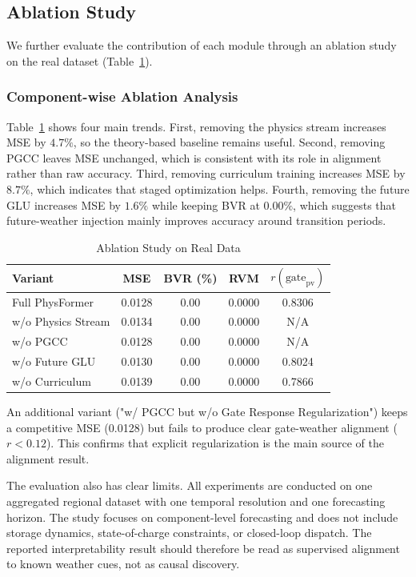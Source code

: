 \subsection{Ablation Study}
\label{subsec:ablation}

We further evaluate the contribution of each module through an ablation study on the real dataset (Table~\ref{tab:ablation}).

\subsubsection{Component-wise Ablation Analysis}
Table~\ref{tab:ablation} shows four main trends. First, removing the physics stream increases MSE by $4.7\%$, so the theory-based baseline remains useful. Second, removing PGCC leaves MSE unchanged, which is consistent with its role in alignment rather than raw accuracy. Third, removing curriculum training increases MSE by $8.7\%$, which indicates that staged optimization helps. Fourth, removing the future GLU increases MSE by $1.6\%$ while keeping BVR at $0.00\%$, which suggests that future-weather injection mainly improves accuracy around transition periods.

\begin{table}[htbp]
\centering
\caption{Ablation Study on Real Data}
\label{tab:ablation}
\footnotesize
\setlength{\tabcolsep}{3pt}
\begin{tabular*}{\columnwidth}{@{\extracolsep{\fill}}lcccc@{}}
\toprule
Variant & MSE & BVR (\%) & RVM & $r(\text{gate}_{\text{pv}})$ \\
\midrule
Full PhysFormer & 0.0128 & 0.00 & 0.0000 & 0.8306 \\
w/o Physics Stream & 0.0134 & 0.00 & 0.0000 & N/A \\
w/o PGCC & 0.0128 & 0.00 & 0.0000 & N/A \\
w/o Future GLU & 0.0130 & 0.00 & 0.0000 & 0.8024 \\
w/o Curriculum & 0.0139 & 0.00 & 0.0000 & 0.7866 \\
\bottomrule
\end{tabular*}
\end{table}

An additional variant ("w/ PGCC but w/o Gate Response Regularization") keeps a competitive MSE (0.0128) but fails to produce clear gate-weather alignment ($r < 0.12$). This confirms that explicit regularization is the main source of the alignment result.

The evaluation also has clear limits. All experiments are conducted on one aggregated regional dataset with one temporal resolution and one forecasting horizon. The study focuses on component-level forecasting and does not include storage dynamics, state-of-charge constraints, or closed-loop dispatch. The reported interpretability result should therefore be read as supervised alignment to known weather cues, not as causal discovery.

